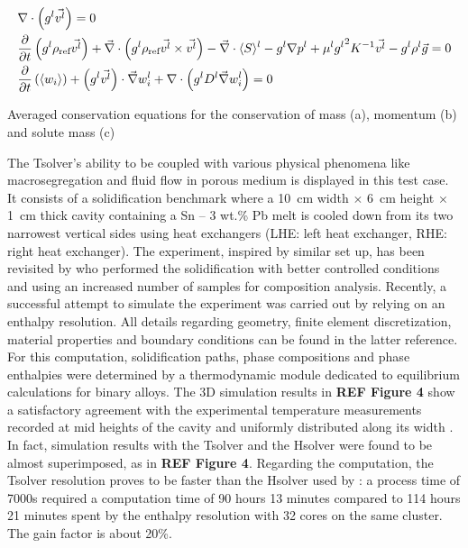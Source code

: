 \begin{table}[h]
\centering
\begin{subequations}
\begin{align}
& \nabla \cdot \left( {g^l} \vec{v^l} \right)  = 0 \\ 
& \frac{\partial}{\partial t} \left( {g^l} \rho_{\text{ref}} \vec{v^l} \right)  + \vec{\nabla} \cdot \left( {g^l} \rho_{\text{ref}} \vec{v^l} \times \vec{v^l} \right) - \vec{\nabla}\cdot\langle S \rangle^l -{g^l}
   \nabla {p^l} +\mu^l {g^l}^2 K^{-1} \vec{v^l} -{g^l}\rho^l \vec{g} = 0 \\
& \frac{\partial}{\partial t} \left( \langle w_i \rangle \right)  + \left( {g^l} \vec{v^l} \right) \cdot \vec{\nabla} w_i^l + \nabla \cdot \left( {g^l} D^l \vec{\nabla} w_i^l  \right) = 0
\end{align}
\end{subequations}
\caption{Averaged conservation equations for the conservation of mass (a), momentum (b) and solute mass (c)}
\label{table:smacs_equations}
\end{table}

The Tsolver’s ability to be coupled with various physical phenomena like macrosegregation and fluid flow 
in porous medium is displayed in this test case. It consists of a solidification benchmark where a \SI{10}{\centi \metre}
width $\times$ \SI{6}{\centi \metre} height $\times$ \SI{1}{\centi \metre} thick cavity containing 
a Sn – 3 wt.\% Pb melt is cooled down from its two 
narrowest vertical sides using heat exchangers (LHE: left heat exchanger, RHE: right heat exchanger). The 
experiment, inspired by \citet{hebditch_observations_1974} similar set up, has been 
revisited by \citet{hachani_experimental_2012} who performed the solidification with better 
controlled conditions and using an increased number of samples for composition analysis. Recently, a successful 
attempt to simulate the experiment was carried out by \citet{carozzani_direct_2013} relying on an enthalpy resolution. 
All details regarding geometry, finite element discretization, material properties 
and boundary conditions can be found in the latter reference. 
For this computation, solidification paths, phase compositions and phase enthalpies were determined by a thermodynamic 
module dedicated to equilibrium calculations for binary alloys. The 3D simulation results in \textbf{REF Figure 4} show 
a satisfactory agreement with the experimental temperature measurements recorded at mid heights of the cavity and uniformly 
distributed along its width \citep{carozzani_direct_2013}. In fact, simulation results with the Tsolver and the Hsolver were 
found to be almost superimposed, as in \textbf{REF Figure 4}. Regarding the computation, the Tsolver resolution proves to be 
faster than the Hsolver used by \citet{carozzani_direct_2013}: a process time of 7000s required a computation time of 90 hours 
13 minutes compared to 114 hours 21 minutes spent by the enthalpy resolution with 32 cores on the same cluster. The gain factor 
is about 20\%.
